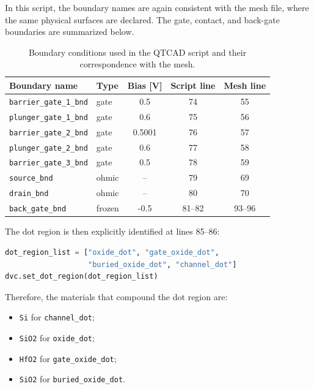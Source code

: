 In this script, the boundary names are again consistent with the mesh file, where the same physical surfaces are declared. The gate, contact, and back-gate boundaries are summarized below.

\begin{table}[H]
\centering
\begin{tabular}{|p{3.2cm}|p{1.3cm}|c|c|c|}
\hline
\textbf{Boundary name} & \textbf{Type} & \textbf{Bias [V]} & \textbf{Script line} & \textbf{Mesh line} \\
\hline
\texttt{barrier\_gate\_1\_bnd} & gate & 0.5 & 74 & 55 \\
\hline
\texttt{plunger\_gate\_1\_bnd} & gate & 0.6 & 75 & 56 \\
\hline
\texttt{barrier\_gate\_2\_bnd} & gate & 0.5001 & 76 & 57 \\
\hline
\texttt{plunger\_gate\_2\_bnd} & gate & 0.6 & 77 & 58 \\
\hline
\texttt{barrier\_gate\_3\_bnd} & gate & 0.5 & 78 & 59 \\
\hline
\texttt{source\_bnd} & ohmic & -- & 79 & 69 \\
\hline
\texttt{drain\_bnd} & ohmic & -- & 80 & 70 \\
\hline
\texttt{back\_gate\_bnd} & frozen & -0.5 & 81--82 & 93--96 \\
\hline
\end{tabular}
\caption{Boundary conditions used in the QTCAD script and their correspondence with the mesh.}
\label{tab:boundary-map}
\end{table}

The dot region is then explicitly identified at lines 85--86:

\begin{lstlisting}[language=Python, caption={Definition of the active dot region.}]
dot_region_list = ["oxide_dot", "gate_oxide_dot",
                   "buried_oxide_dot", "channel_dot"]
dvc.set_dot_region(dot_region_list)
\end{lstlisting}

Therefore, the materials that compound the dot region are:
\begin{itemize}
    \item \texttt{Si} for \texttt{channel\_dot};
    \item \texttt{SiO2} for \texttt{oxide\_dot};
    \item \texttt{HfO2} for \texttt{gate\_oxide\_dot};
    \item \texttt{SiO2} for \texttt{buried\_oxide\_dot}.
\end{itemize}

